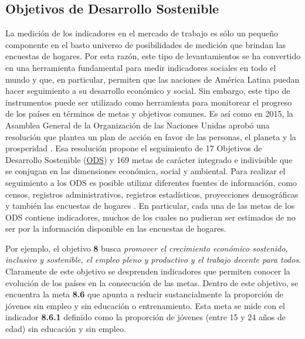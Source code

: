 \documentclass[
  10pt,
  spanish,
]{book}
\begin{document}
\hypertarget{objetivos-de-desarrollo-sostenible}{%
\subsection*{Objetivos de Desarrollo Sostenible}\label{objetivos-de-desarrollo-sostenible}}

La medición de los indicadores en el mercado de trabajo es sólo un pequeño componente en el basto universo de posibilidades de medición que brindan las encuestas de hogares. Por esta razón, este tipo de levantamientos se ha convertido en una herramienta fundamental para medir indicadores sociales en todo el mundo y que, en particular, permiten que las naciones de América Latina puedan hacer seguimiento a su desarrollo económico y social. Sin embargo, este tipo de instrumentos puede ser utilizado como herramienta para monitorear el progreso de los países en términos de metas y objetivos comunes. Es así como en 2015, la Asamblea General de la Organización de las Naciones Unidas aprobó una resolución que plantea un plan de acción en favor de las personas, el planeta y la prosperidad \citep{United_Nations_2015}. Esa resolución propone el seguimiento de 17 Objetivos de Desarrollo Sostenible (\href{https://sustainabledevelopment.un.org}{ODS}) y 169 metas de carácter integrado e indivisible que se conjugan en las dimensiones económica, social y ambiental. Para realizar el seguimiento a los ODS es posible utilizar diferentes fuentes de información, como censos, registros administrativos, registros estadísticos, proyecciones demográficas y también las encuestas de hogares \citep{United_Nations_2016}. En particular, cada una de las metas de los ODS contiene indicadores, muchos de los cuales no pudieran ser estimados de no ser por la información disponible en las encuestas de hogares.

Por ejemplo, el objetivo \textbf{8} busca \emph{promover el crecimiento económico sostenido, inclusivo y sostenible, el empleo pleno y productivo y el trabajo decente para todos}. Claramente de este objetivo se desprenden indicadores que permiten conocer la evolución de los países en la consecución de las metas. Dentro de este objetivo, se encuentra la meta \textbf{8.6} que apunta a reducir sustancialmente la proporción de jóvenes sin empleo y sin educación o entrenamiento. Esta meta se mide con el indicador \textbf{8.6.1} definido como la proporción de jóvenes (entre 15 y 24 años de edad) sin educación y sin empleo.
\end{document}
